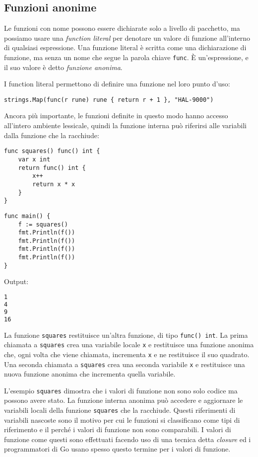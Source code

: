 \documentclass[../../thesis.tex]{subfiles}
\begin{document}
    \subsection{Funzioni anonime}\label{subsec:funzioni-anonime}
    Le funzioni con nome possono essere dichiarate solo a livello di pacchetto, ma possiamo usare una \textit{function literal} per denotare un valore di funzione all'interno di qualsiasi espressione.
    Una funzione literal è scritta come una dichiarazione di funzione, ma senza un nome che segue la parola chiave \verb"func".
    È un'espressione, e il suo valore è detto \textit{funzione anonima}.
    \hfill \vspace{12pt}

    I function literal permettono di definire una funzione nel loro punto d'uso:
    \begin{lstlisting}[frame = single, label = {lst:lstlisting4-6.1}]
strings.Map(func(r rune) rune { return r + 1 }, "HAL-9000")
    \end{lstlisting}
    Ancora più importante, le funzioni definite in questo modo hanno accesso all'intero ambiente lessicale, quindi la funzione interna può riferirsi alle variabili dalla funzione che la racchiude:
    \begin{lstlisting}[frame = single, label = {lst:lstlisting4-6.2}]
func squares() func() int {
    var x int
    return func() int {
        x++
        return x * x
    }
}
    \end{lstlisting}
    \clearpage
    \newpage
    \begin{lstlisting}[frame = single, label = {lst:lstlisting4-6.3}]
func main() {
    f := squares()
    fmt.Println(f())
    fmt.Println(f())
    fmt.Println(f())
    fmt.Println(f())
}
    \end{lstlisting}
    Output:
    \begin{lstlisting}[language = bash, frame = L, label = {lst:lstlisting4-6.4}]
1
4
9
16
    \end{lstlisting}
    La funzione \verb"squares" restituisce un'altra funzione, di tipo \verb"func() int".
    La prima chiamata a \verb"squares" crea una variabile locale \verb"x" e restituisce una funzione anonima che, ogni volta che viene chiamata, incrementa \verb"x" e ne restituisce il suo quadrato.
    Una seconda chiamata a \verb"squares" crea una seconda variabile \verb"x" e restituisce una nuova funzione anonima che incrementa quella variabile.
    \hfill \vspace{12pt}

    L'esempio \verb"squares" dimostra che i valori di funzione non sono solo codice ma possono avere stato.
    La funzione interna anonima può accedere e aggiornare le variabili locali della funzione \verb"squares" che la racchiude.
    Questi riferimenti di variabili nascoste sono il motivo per cui le funzioni si classificano come tipi di riferimento e il perché i valori di funzione non sono comparabili.
    I valori di funzione come questi sono effettuati facendo uso di una tecnica detta \textit{closure} ed i programmatori di Go usano spesso questo termine per i valori di funzione.
    \hfill \vspace{12pt}
\end{document}
